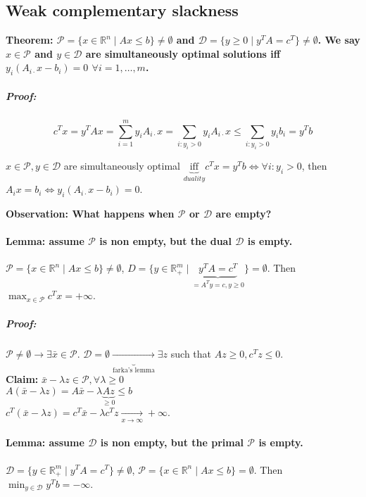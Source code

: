 \documentclass[main]{subfiles}
\begin{document}
\subsection{Weak complementary slackness}
\textbf{Theorem: $\mathcal{P} = \{x \in \mathbb{R}^n \mid Ax \leq b \} \neq
\emptyset$ and $\mathcal{D} = \{ y \geq 0 \mid y^T A = c^T \} \neq \emptyset$.
We say $x \in \mathcal{P}$ and $y \in \mathcal{D}$ are simultaneously optimal
solutions iff $y_i (A_{i\cdot}x - b_i) = 0$ $\forall i = 1, \dots, m$. }

\subparagraph{Proof:}
\begin{equation} \label{eq:proof-weak-slackness}
c^T x = y^T Ax = \sum_{i=1}^{m} y_i A_{i\cdot} x = \sum_{i: y_i > 0} y_i A_{i
\cdot} x \leq \sum_{i: y_i > 0} y_i b_i = y^T b
\end{equation}

$x \in \mathcal{P}, y \in \mathcal{D}$ are simultaneously optimal 
$\underbrace{\text{iff}}_{duality} c^T x = y^T b \iff \forall i: y_i > 0$, then
$A_i x = b_i \iff y_i(A_{i\cdot}x - b_i) = 0$.

\textbf{Observation: What happens when $\mathcal{P}$ or $\mathcal{D}$ are
empty?}

\paragraph{Lemma: assume $\mathcal{P}$ is non empty, but the dual $\mathcal{D}$
is empty.}
$\mathcal{P} = \{ x \in \mathbb{R}^n \mid Ax \leq b \} \neq \emptyset$,
$D = \{y \in \mathbb{R}^m_+ \mid \underbrace{y^T A = c^T}_{= A^T y = c, y \geq
0} \} =  \emptyset$. Then $\displaystyle \max_{x \in \mathcal{P}} c^{T}
x = +\infty$.

\subparagraph{Proof:}
$\mathcal{P} \neq \emptyset \rightarrow \exists \bar{x} \in \mathcal{P}$.
$\mathcal{D} = \emptyset \underbrace{\rightarrow}_{\text{farka's lemma}}
\exists z$ such that $Az \geq 0, c^T z \leq 0$. \\

\textbf{Claim:} $\bar{x} - \lambda z \in \mathcal{P}, \forall \lambda \geq 0$\\
$A(\bar{x} - \lambda z) = A\bar{x} - \lambda \underbrace{Az}_{\geq 0} \leq b$\\
$c^T(\bar{x} - \lambda z) = c^T \bar{x} - \lambda c^T z \xrightarrow[x \to
\infty]{} +\infty$.

\paragraph{Lemma: assume $\mathcal{D}$ is non empty, but the primal
$\mathcal{P}$ is empty.}
$\mathcal{D} = \{y \in \mathbb{R}^m_+ \mid y^T A = c^T \} \neq \emptyset$,
$\mathcal{P} = \{x \in \mathbb{R}^n \mid Ax \leq b \} = \emptyset$. Then
$\displaystyle \min_{y \in \mathcal{D}} y^{T} b = -\infty$.
\end{document}
